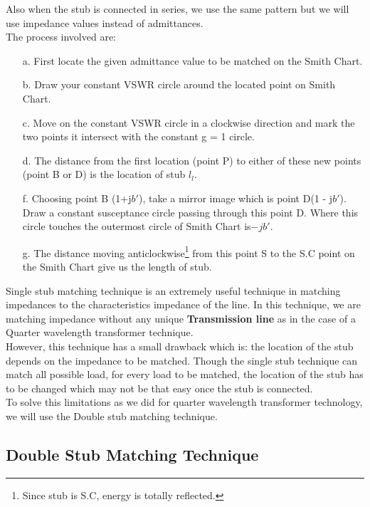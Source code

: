 Also when the stub is connected in series, we use the same pattern but we will use impedance values instead of admittances.\\
The process involved are:\\
\begin{itemize}
\item[a.]First locate the given admittance value to be matched on the Smith Chart.
\item[b.]Draw your constant VSWR circle around the located point on Smith Chart.
\item[c.] Move on the constant VSWR circle in a clockwise direction and mark the two points it intersect with the constant g = 1 circle.
\item[d.]The distance from the first location (point P) to either of these new points (point B or D) is the location of stub $l_l$.
\item[f.] Choosing point B (1+j$b'$), take a mirror image which is point D(1 - j$b'$). Draw a constant susceptance circle passing through this point D. Where this circle touches the outermost circle of Smith Chart is$ -jb'$.
\item[g.] The distance moving anticlockwise\footnote{Since stub is S.C, energy is totally reflected.} from this point S to the S.C point on the Smith Chart give us the length of stub.
\end{itemize}

Single stub matching technique is an extremely useful technique in matching impedances to the characteristics impedance of the line. In this technique, we are matching impedance without any unique \textbf{Transmission line} as in the case of a Quarter wavelength transformer technique.\\

However, this technique has a small drawback which is: the location of the stub depends on the impedance to be matched. Though the single stub technique can match all possible load, for every load to be matched, the location of the stub has to be changed which may not be that easy once the stub is connected.\\

To solve this limitations as we did for quarter wavelength transformer technology, we will use the Double stub matching technique.
\subsection{Double Stub Matching Technique}

